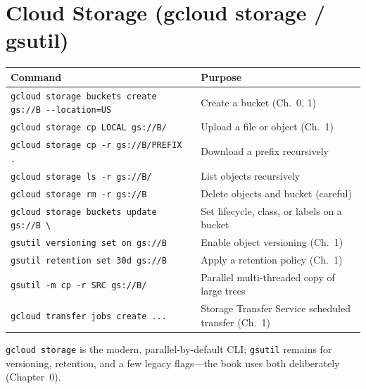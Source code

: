 \section{Cloud Storage (gcloud storage / gsutil)}
\begin{center}
\footnotesize
\begin{tabular}{@{}p{6.6cm}p{6.2cm}@{}}
\toprule
\textbf{Command} & \textbf{Purpose} \\
\midrule
\texttt{gcloud storage buckets create gs://B -{}-location=US} & Create a bucket (Ch.~0, 1) \\
\texttt{gcloud storage cp LOCAL gs://B/} & Upload a file or object (Ch.~1) \\
\texttt{gcloud storage cp -r gs://B/PREFIX . } & Download a prefix recursively \\
\texttt{gcloud storage ls -r gs://B/} & List objects recursively \\
\texttt{gcloud storage rm -r gs://B} & Delete objects and bucket (careful) \\
\texttt{gcloud storage buckets update gs://B \textbackslash} & Set lifecycle, class, or labels on a bucket \\
\texttt{gsutil versioning set on gs://B} & Enable object versioning (Ch.~1) \\
\texttt{gsutil retention set 30d gs://B} & Apply a retention policy (Ch.~1) \\
\texttt{gsutil -m cp -r SRC gs://B/} & Parallel multi-threaded copy of large trees \\
\texttt{gcloud transfer jobs create ...} & Storage Transfer Service scheduled transfer (Ch.~1) \\
\bottomrule
\end{tabular}
\end{center}

\noindent\texttt{gcloud storage} is the modern, parallel-by-default CLI; \texttt{gsutil} remains
for versioning, retention, and a few legacy flags---the book uses both deliberately (Chapter~0).

